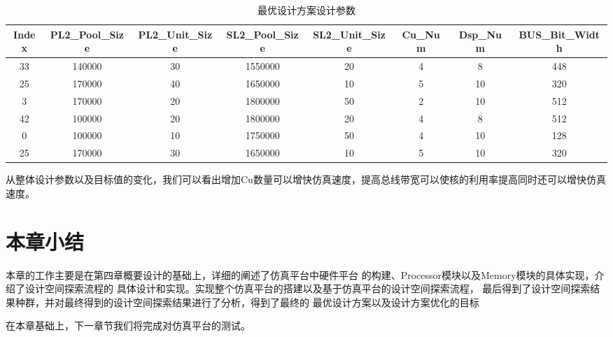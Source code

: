 \begin{table}[h]
    \centering\footnotesize
    \caption{最优设计方案设计参数}
    \begin{tabular}{|c|c|c|c|c|c|c|c|}
    \hline
    Index & PL2\_Pool\_Size & PL2\_Unit\_Size & SL2\_Pool\_Size & SL2\_Unit\_Size & Cu\_Num & Dsp\_Num & BUS\_Bit\_Width \\ \hline
    33    & 140000          & 30              & 1550000         & 20              & 4       & 8        & 448             \\ \hline
    25    & 170000          & 40              & 1650000         & 10              & 5       & 10       & 320             \\ \hline
    3     & 170000          & 20              & 1800000         & 50              & 2       & 10       & 512             \\ \hline
    42    & 100000          & 20              & 1800000         & 20              & 4       & 8        & 512             \\ \hline
    0     & 100000          & 10              & 1750000         & 50              & 4       & 10       & 128             \\ \hline
    25    & 170000          & 30              & 1650000         & 10              & 5       & 10       & 320             \\ \hline
    \end{tabular}
    \end{table}

从整体设计参数以及目标值的变化，我们可以看出增加Cu数量可以增快仿真速度，提高总线带宽可以使核的利用率提高同时还可以增快仿真速度。

\section{本章小结}

本章的工作主要是在第四章概要设计的基础上，详细的阐述了仿真平台中硬件平台
的构建、Processor模块以及Memory模块的具体实现，介绍了设计空间探索流程的
具体设计和实现。实现整个仿真平台的搭建以及基于仿真平台的设计空间探索流程，
最后得到了设计空间探索结果种群，并对最终得到的设计空间探索结果进行了分析，得到了最终的
最优设计方案以及设计方案优化的目标

在本章基础上，下一章节我们将完成对仿真平台的测试。